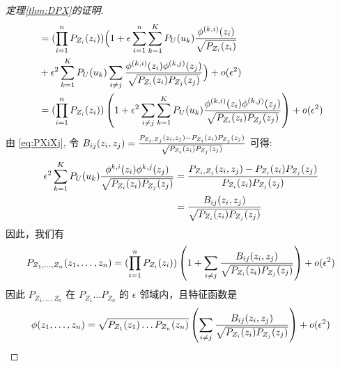 \begin{proof}[定理\ref{thm:DPX}的证明]
\begin{align*}
&= (\prod_{i=1}^n  P_{Z_i} (z_i))
\Big(1+\epsilon\sum_{i=1}^n \sum_{k=1}^{K} P_U(u_k){\phi^{(k,i)}(z_i) \over \sqrt{P_{Z_i}(z_i)}} \\
&+\epsilon^2 \sum_{k=1}^{K} P_U(u_k)\sum_{i\neq j}{\phi^{(k,i)}(z_i)\phi^{(k,j)}(z_j)\over \sqrt{P_{Z_i}(z_i)P_{Z_j}(z_j)} } 
\Big) + o(\epsilon^2)\\
&= (\prod_{i=1}^n  P_{Z_i} (z_i))
\left(1 +\epsilon^2\sum_{i\neq j} \sum_{k=1}^{K}P_U(u_k){\phi^{(k,i)}(z_i)\phi^{(k,j)}(z_j)\over \sqrt{P_{Z_i}(z_i)P_{Z_j}(z_j)} }\right) + o(\epsilon^2)
\end{align*}
由 \eqref{eq:PXiXj},
令 $B_{ij}(z_i, z_j)={P_{Z_i, Z_j}(z_i,z_j) - P_{Z_i}(z_i)P_{Z_j}(z_j) \over \sqrt{P_{Z_i}(z_i)P_{Z_j}(z_j)}} $ 可得:
\begin{align}
\epsilon^2\sum_{k=1}^{K}P_U(u_k)
{\phi^{k,i}(z_i)\phi^{k,j}(z_j)\over \sqrt{P_{Z_i}(z_i)P_{Z_j}(z_j)} } & = {P_{Z_i, Z_j}(z_i, z_j) - P_{Z_i}(z_i)P_{Z_j}(z_j) \over P_{Z_i}(z_i)P_{Z_j}(z_j)} \notag\\
& = {B_{ij}(z_i, z_j) \over \sqrt{P_{Z_i}(z_i)P_{Z_j}(z_j)} } \label{eq:Bsecond}
\end{align}
因此，我们有
\begin{equation}\label{eq:sep}
P_{Z_1,\dots,Z_n}(z_1,\dots,z_n) =  (\prod_{i=1}^n  P_{Z_i} (z_i))\left ( 1 + \sum_{i\neq j}{B_{ij}(z_i, z_j) \over \sqrt{P_{Z_i}(z_i)P_{Z_j}(z_j)} }\right) +o(\epsilon^2)
\end{equation}
因此 $P_{Z_1,\dots, Z_n}$ 在 $P_{Z_1}\dots P_{Z_n}$ 的
$\epsilon$ 邻域内，且特征函数是
$$\phi(z_1,\dots, z_n)=
\sqrt{P_{Z_1}(z_1)\dots P_{Z_n}(z_n)}
\left(\sum_{i\neq j}{B_{ij}(z_i, z_j) 
\over \sqrt{P_{Z_i}(z_i)P_{Z_j}(z_j)} }\right)
+o(\epsilon^2)$$


\end{proof}
